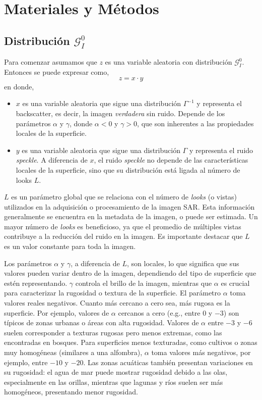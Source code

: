 \chapter{Materiales y Métodos}
\label{materiales}

\section{Distribución \( \mathcal{G}_I^0 \)}

Para comenzar asumamos que $z$ es una variable aleatoria con distribución \( \mathcal{G}_I^0 \). Entonces se puede expresar como,
\begin{equation} \label{eq:zxy}
z = x \cdot y
\end{equation}
en donde,
\begin{itemize}
    \item $x$ es una variable aleatoria que sigue una distribución $\Gamma^{-1}$ y representa el backscatter, es decir, la imagen \textit{verdadera} sin ruido. Depende de los parámetros $\alpha$ y $\gamma$, donde $\alpha < 0$ y $\gamma > 0$, que son inherentes a las propiedades locales de la superficie.
    \item $y$ es una variable aleatoria que sigue una distribución $\Gamma$ y representa el ruido \emph{speckle}. A diferencia de $x$, el ruido \emph{speckle} no depende de las características locales de la superficie, sino que su distribución está ligada al número de looks $L$.
\end{itemize}
$L$ es un parámetro global que se relaciona con el número de \emph{looks} (o vistas) utilizados en la adquisición o procesamiento de la imagen SAR. Esta información generalmente se encuentra en la metadata de la imagen, o puede ser estimada. Un mayor número de \emph{looks} es beneficioso, ya que el promedio de múltiples vistas contribuye a la reducción del ruido en la imagen. Es importante destacar que $L$ es un valor constante para toda la imagen.

Los parámetros $\alpha$ y $\gamma$, a diferencia de $L$, son locales, lo que significa que sus valores pueden variar dentro de la imagen, dependiendo del tipo de superficie que estén representando. $\gamma$ controla el brillo de la imagen, mientras que $\alpha$ es crucial para caracterizar la rugosidad o textura de la superficie. El parámetro $\alpha$ toma valores reales negativos. Cuanto más cercano a cero sea, más rugosa es la superficie. Por ejemplo, valores de $\alpha$ cercanos a cero (e.g., entre $0$ y $-3$) son típicos de zonas urbanas o áreas con alta rugosidad. Valores de $\alpha$ entre $-3$ y $-6$ suelen corresponder a texturas rugosas pero menos extremas, como las encontradas en bosques. Para superficies menos texturadas, como cultivos o zonas muy homogéneas (similares a una alfombra), $\alpha$ toma valores más negativos, por ejemplo, entre $-10$ y $-20$. Las zonas acuáticas también presentan variaciones en su rugosidad: el agua de mar puede mostrar rugosidad debido a las olas, especialmente en las orillas, mientras que lagunas y ríos suelen ser más homogéneos, presentando menor rugosidad.

